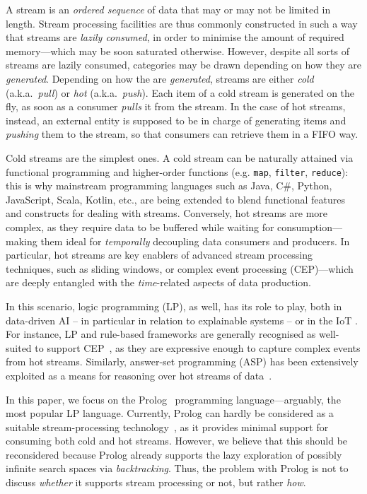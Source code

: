 \documentclass[12pt,a4paper,openright,twoside]{book}
\begin{document}
A stream is an \emph{ordered sequence} of data that may or may not be limited in length.
%
Stream processing facilities are thus commonly constructed in such a way that streams are \emph{lazily consumed}, in order to minimise the amount of required memory---which may be soon saturated otherwise.
%
However, despite all sorts of streams are lazily consumed, categories may be drawn depending on how they are \emph{generated}.
%
Depending on how the are \emph{generated}, streams are either \emph{cold} (a.k.a.\ \emph{pull}) or \emph{hot} (a.k.a.\ \emph{push}).
%
Each item of a cold stream is generated on the fly, as soon as a consumer \emph{pulls} it from the stream.
%
In the case of hot streams, instead, an external entity is supposed to be in charge of generating items and \emph{pushing} them to the stream, so that consumers can retrieve them in a FIFO way.

Cold streams are the simplest ones.
%
A cold stream can be naturally attained via functional programming and higher-order functions (e.g. \texttt{map}, \texttt{filter}, \texttt{reduce}): this is why mainstream programming languages such as Java, C\#, Python, JavaScript, Scala, Kotlin, etc., are being extended to blend functional features and constructs for dealing with streams.
%
Conversely, hot streams are more complex, as they require data to be buffered while waiting for consumption---making them ideal for \emph{temporally} decoupling data consumers and producers.
%
In particular, hot streams are key enablers of advanced stream processing techniques, such as sliding windows, or complex event processing (CEP)---which are deeply entangled with the \emph{time}-related aspects of data production.

In this scenario,  logic programming (LP), as well, has its role to play, both in data-driven AI -- in particular in relation to explainable systems \cite{xaisurvey-ia14} -- or in the IoT \cite{lpaas-bdcc2}.
%
For instance,  LP and rule-based frameworks are generally recognised as well-suited to support CEP~\cite{AnicicFRSSS10,AnicicRFS12}, as they are expressive enough to capture complex events from hot streams.
%
Similarly, answer-set programming (ASP) has been extensively exploited as a means for reasoning over hot streams of data~\cite{EiterIST05,BeckEB17,Beck2018}.

In this paper, we focus on the Prolog~\cite{ColmerauerR93} programming language---arguably, the most popular LP language.
%
Currently, Prolog can hardly be considered as a suitable stream-processing technology~\cite{Tarau2019}, as it provides minimal support for consuming both cold and hot streams.
%
However, we believe that this should be reconsidered because Prolog already supports the lazy exploration of possibly infinite search spaces via \emph{backtracking}.
%
Thus, the problem with Prolog is not to discuss \emph{whether} it supports stream processing or not, but rather \emph{how}.
\end{document}

